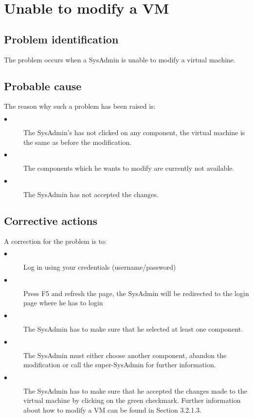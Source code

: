 \section{Unable to modify a VM}

\subsection{Problem identification}
The problem occurs when a SysAdmin is unable to modify a virtual
machine.

\subsection{Probable cause}

The reason why such a problem has been raised is:\\
\begin{description}
  \item[$\bullet$] The SysAdmin's has not clicked on any component, the virtual
  machine is the same as before the modification.
  \item[$\bullet$] The components which he wants to modify are currently not
  available.
  \item[$\bullet$] The SysAdmin has not accepted the changes.
\end{description}


\subsection{Corrective actions}

A correction for the problem is to:\\
\begin{description}
  \item[$\bullet$] Log in using your credentials (username/password)
  \item[$\bullet$] Press F5 and refresh the page, the SysAdmin will be redirected to
  the login page where he has to login
  \item[$\bullet$] The SysAdmin has to make sure that he selected at least one
  component.
  \item[$\bullet$] The SysAdmin must either choose another component, abandon
  the modification or call the super-SysAdmin for further information.
  \item[$\bullet$] The SysAdmin has to make sure that he accepted the changes made
to the virtual machine by clicking on the green checkmark. Further information about
how to modify a VM can be found in Section 3.2.1.3.
\end{description}







